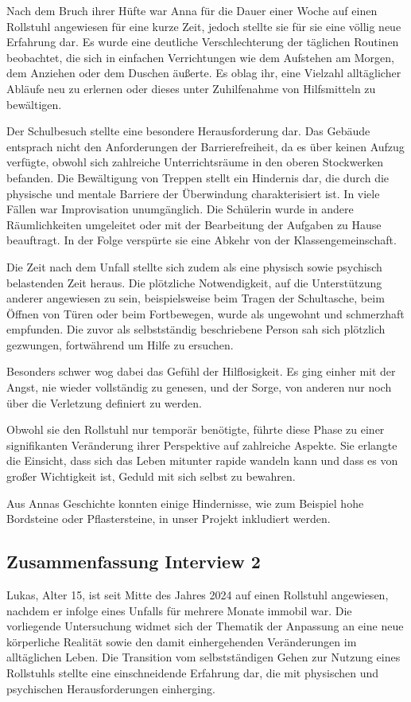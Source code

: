 Nach dem Bruch ihrer Hüfte war Anna für die Dauer einer Woche auf einen Rollstuhl angewiesen für
eine kurze Zeit, jedoch stellte sie für sie eine völlig neue Erfahrung dar. Es wurde eine 
deutliche Verschlechterung der täglichen Routinen beobachtet, die sich in einfachen Verrichtungen wie dem Aufstehen am Morgen, dem Anziehen oder dem Duschen äußerte. Es oblag ihr, eine Vielzahl alltäglicher Abläufe neu zu erlernen oder dieses unter Zuhilfenahme von Hilfsmitteln zu bewältigen.

Der Schulbesuch stellte eine besondere Herausforderung dar. Das Gebäude entsprach nicht den Anforderungen der Barrierefreiheit, da es über keinen Aufzug verfügte, obwohl sich zahlreiche 
Unterrichtsräume in den oberen Stockwerken befanden. Die Bewältigung von Treppen stellt ein
Hindernis dar, die durch die physische und mentale Barriere der Überwindung charakterisiert ist. In viele Fällen war Improvisation unumgänglich. Die Schülerin wurde in andere Räumlichkeiten umgeleitet oder mit der Bearbeitung der Aufgaben zu Hause beauftragt. In der Folge verspürte sie eine Abkehr von der Klassengemeinschaft.

Die Zeit nach dem Unfall stellte sich zudem als eine physisch sowie psychisch belastenden Zeit 
heraus. Die plötzliche Notwendigkeit, auf die Unterstützung anderer angewiesen zu sein, 
beispielsweise beim Tragen der Schultasche, beim Öffnen von Türen oder beim Fortbewegen, wurde 
als ungewohnt und schmerzhaft empfunden. Die zuvor als selbstständig beschriebene Person sah sich plötzlich gezwungen, fortwährend um Hilfe zu ersuchen.

Besonders schwer wog dabei das Gefühl der Hilflosigkeit. Es ging einher mit der Angst, nie wieder vollständig zu genesen, und der Sorge, von anderen nur noch über die Verletzung definiert zu werden.

Obwohl sie den Rollstuhl nur temporär benötigte, führte diese Phase zu einer signifikanten 
Veränderung ihrer Perspektive auf zahlreiche Aspekte. Sie erlangte die Einsicht, dass sich das 
Leben mitunter rapide wandeln kann und dass es von großer Wichtigkeit ist, Geduld mit sich 
selbst zu bewahren.

Aus Annas Geschichte konnten einige Hindernisse, wie zum Beispiel hohe Bordsteine oder Pflastersteine, in unser Projekt inkludiert werden.

\cite{ElisaKaltenberger12026}

\subsection{Zusammenfassung Interview 2}
Lukas, Alter 15, ist seit Mitte des Jahres 2024 auf einen Rollstuhl angewiesen, nachdem er 
infolge eines Unfalls für mehrere Monate immobil war. Die vorliegende Untersuchung widmet sich der
Thematik der Anpassung an eine neue körperliche Realität sowie den damit einhergehenden Veränderungen im alltäglichen Leben. Die Transition vom selbstständigen Gehen zur Nutzung eines Rollstuhls stellte eine einschneidende Erfahrung dar, die mit physischen und psychischen Herausforderungen einherging.

